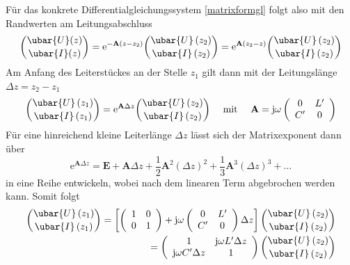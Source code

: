 Für das konkrete Differentialgleichungssystem \ref{matrixformgl} folgt also mit den Randwerten am Leitungsabschluss
\begin{equation}
	\binom{\ubar{U}(z)}{\ubar{I}(z)}=\mathrm{e}^{-\mathbf{A}\left(z-z_{2}\right)}\binom{\ubar{U}\left(z_{2}\right)}{\ubar{I}\left(z_{2}\right)}=\mathrm{e}^{\mathbf{A}\left(z_{2}-z\right)}\binom{\ubar{U}\left(z_{2}\right)}{\ubar{I}\left(z_{2}\right)} 
\end{equation}
Am Anfang des Leiterstückes an der Stelle $z_{1}$ gilt dann mit der Leitungslänge $\Delta z=z_{2}-z_{1}$
\begin{equation}
\binom{\ubar{U}\left(z_{1}\right)}{\ubar{I}\left(z_{1}\right)}=\mathrm{e}^{\mathbf{A} \Delta z}\binom{\ubar{U}\left(z_{2}\right)}{\ubar{I}\left(z_{2}\right)} \quad \text { mit } \quad \mathbf{A}=\mathrm{j} \omega\left(\begin{array}{cc}
	0 & L^{\prime}  \\
	C^{\prime} & 0
\end{array}\right)
\end{equation}
Für eine hinreichend kleine Leiterlänge $\Delta z$ lässt sich der Matrixexponent dann über
\begin{equation}
	\mathrm{e}^{\mathbf{A} \Delta z}=\mathbf{E}+\mathbf{A} \Delta z+\frac{1}{2} \mathbf{A}^{2}(\Delta z)^{2}+\frac{1}{3} \mathbf{A}^{3}(\Delta z)^{3}+\ldots 
\end{equation}
in eine Reihe entwickeln, wobei nach dem linearen Term abgebrochen werden kann. Somit folgt
\begin{equation}\begin{split}
\binom{\ubar{U}\left(z_{1}\right)}{\ubar{I}\left(z_{1}\right)}=\left[\left(\begin{array}{ll}
	1 & 0  \\
	0 & 1
\end{array}\right)+\mathrm{j} \omega\left(\begin{array}{cc}
	0 & L^{\prime} \\
	C^{\prime} & 0
\end{array}\right) \Delta z\right]\binom{\ubar{U}\left(z_{2}\right)}{\ubar{I}\left(z_{2}\right)}&\\
=\left(\begin{array}{cc}
	1 & \mathrm{j} \omega L^{\prime} \Delta z \\
	\mathrm{j} \omega C^{\prime} \Delta z & 1
\end{array}\right)\binom{\ubar{U}\left(z_{2}\right)}{\ubar{I}\left(z_{2}\right)}
\end{split}\end{equation}

